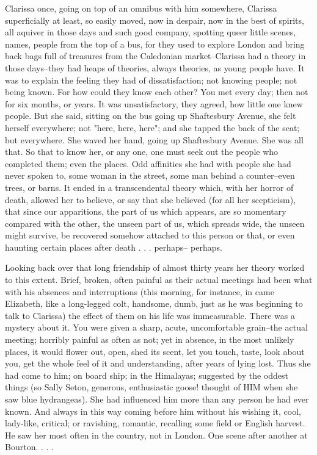 \documentclass[lang=cn,10pt]{elegantbook}
\begin{document}
Clarissa once, going on top of an omnibus with him somewhere,
Clarissa superficially at least, so easily moved, now in despair,
now in the best of spirits, all aquiver in those days and such good
company, spotting queer little scenes, names, people from the top
of a bus, for they used to explore London and bring back bags full
of treasures from the Caledonian market--Clarissa had a theory in
those days--they had heaps of theories, always theories, as
young people have.  It was to explain the feeling they had of
dissatisfaction; not knowing people; not being known.  For how
could they know each other?  You met every day; then not for six
months, or years.  It was unsatisfactory, they agreed, how little
one knew people.  But she said, sitting on the bus going up
Shaftesbury Avenue, she felt herself everywhere; not "here, here,
here"; and she tapped the back of the seat; but everywhere.  She
waved her hand, going up Shaftesbury Avenue.  She was all that.  So
that to know her, or any one, one must seek out the people who
completed them; even the places.  Odd affinities she had with
people she had never spoken to, some woman in the street, some man
behind a counter--even trees, or barns.  It ended in a transcendental
theory which, with her horror of death, allowed her to believe, or
say that she believed (for all her scepticism), that since our
apparitions, the part of us which appears, are so momentary compared
with the other, the unseen part of us, which spreads wide, the
unseen might survive, be recovered somehow attached to this person
or that, or even haunting certain places after death . . . perhaps--
perhaps.

Looking back over that long friendship of almost thirty years her
theory worked to this extent.  Brief, broken, often painful as
their actual meetings had been what with his absences and
interruptions (this morning, for instance, in came Elizabeth, like
a long-legged colt, handsome, dumb, just as he was beginning to
talk to Clarissa) the effect of them on his life was immeasurable.
There was a mystery about it.  You were given a sharp, acute,
uncomfortable grain--the actual meeting; horribly painful as often
as not; yet in absence, in the most unlikely places, it would
flower out, open, shed its scent, let you touch, taste, look about
you, get the whole feel of it and understanding, after years of
lying lost.  Thus she had come to him; on board ship; in the
Himalayas; suggested by the oddest things (so Sally Seton,
generous, enthusiastic goose! thought of HIM when she saw blue
hydrangeas).  She had influenced him more than any person he had
ever known.  And always in this way coming before him without his
wishing it, cool, lady-like, critical; or ravishing, romantic,
recalling some field or English harvest.  He saw her most often
in the country, not in London.  One scene after another at
Bourton. . . .
\end{document}
